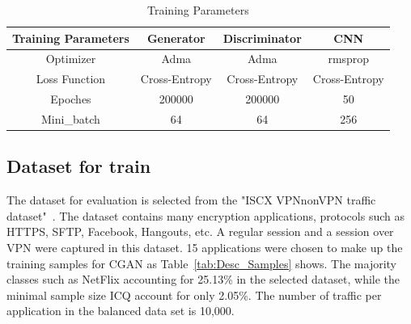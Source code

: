 \documentclass[conference]{IEEEtran}
\begin{document}
\linespread{1.5}
\begin{table}[htbp]
\fontsize{6.5}{8}
\caption{Training Parameters}
\begin{center}
\begin{tabular}{c c c c}
\hline
\textbf{Training Parameters}&{\textbf{Generator}}&{\textbf{Discriminator}}&{\textbf{CNN}} \\
\hline
Optimizer & Adma & Adma & rmsprop  \\
Loss Function & Cross-Entropy & Cross-Entropy &Cross-Entropy \\
Epoches & 200000 & 200000 & 50\\
Mini\_batch & 64 & 64 & 256\\

\end{tabular}
\label{training_parameters}
\end{center}
\end{table}



\subsection {Dataset for train}
The dataset for evaluation is selected from the "ISCX VPN\-nonVPN traffic dataset"~\cite{r21}. The dataset contains many encryption applications, protocols such as HTTPS, SFTP, Facebook, Hangouts, etc. A regular session and a session over VPN were captured in this dataset. 15 applications were chosen to make up the training samples for CGAN as Table~\ref{tab:Desc_Samples} shows. The majority classes such as NetFlix accounting for 25.13\% in the selected dataset, while the minimal sample size ICQ account for only 2.05\%. The number of traffic per application in the balanced data set is 10,000.
\end{document}
